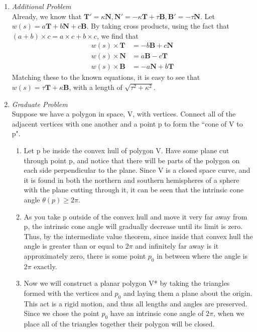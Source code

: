 \documentclass{article}
\begin{document}
\begin{enumerate}
\item \textit{Additional Problem}\\
Already, we know that $\mathbf{T'} =\kappa\mathbf{N}, \mathbf{N'} = -\kappa\mathbf{T} + \tau\mathbf{B}, \mathbf{B'} = -\tau\mathbf{N}$. 
Let $w(s) = a\mathbf{T} + b\mathbf{N} + c\mathbf{B}$.
By taking cross products, using the fact that $(a + b)\times c = a \times c + b \times c$, we find that
\begin{align*}
w(s) \times \mathbf{T} &= -b\mathbf{B} + c\mathbf{N}\\
w(s) \times \mathbf{N} &= a\mathbf{B} - c\mathbf{T}\\
w(s) \times \mathbf{B} &= -a\mathbf{N} + b\mathbf{T}
\end{align*}
Matching these to the known equations, it is easy to see that $w(s) = \tau\mathbf{T} + \kappa\mathbf{B}$, with a length of $\sqrt{\tau^2 + \kappa^2}$.

\item \textit{Graduate Problem}\\

Suppose we have a polygon in space, V, with vertices.
Connect all of the adjacent vertices with one another and a point p to form the ``cone of V to p".

\begin{enumerate}

\item Let p be inside the convex hull of polygon V. 
Have some plane cut through point p, and notice that there will be parts of the polygon on each side perpendicular to the plane.
Since V is a closed space curve, and it is found in both the northern and southern hemispheres of a sphere with the plane cutting through it, it can be seen that the intrinsic cone angle $\theta(p) \geq 2\pi$.

\item As you take p outside of the convex hull and move it very far away from p, the intrinsic cone angle will gradually decrease until its limit is zero.
Thus, by the intermediate value theorem, since inside that convex hull the angle is greater than or equal to $2\pi$ and infinitely far away is it approximately zero, there is some point $p_0$ in between 
where the angle is $2\pi$ exactly.

\item Now we will construct a planar polygon V* by taking the triangles formed with the vertices and $p_0$ and laying them a plane about the origin.
This act is a rigid motion, and thus all lengths and angles are preserved. 
Since we chose the point $p_0$ have an intrinsic cone angle of $2\pi$, when we place all of the triangles together their polygon will be closed.


\end{enumerate}
\end{enumerate}
\end{document}
